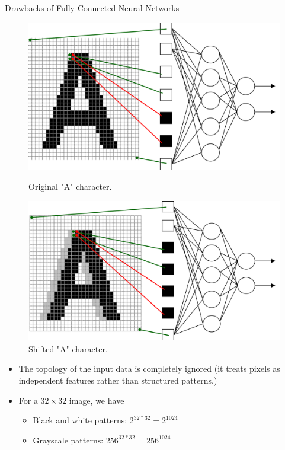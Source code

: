 \documentclass[10pt]{beamer}
\theoremstyle{remark}
\theoremstyle{definition}
\begin{document}
\begin{frame}[allowframebreaks]{Drawbacks of Fully-Connected Neural Networks}
\begin{figure}[ht]
\centering
\begin{minipage}[t]{0.45\textwidth}
    \centering
    \includegraphics[width=\textwidth,height=0.7\textheight,keepaspectratio]{./images/nn_3.png}
    \caption{Original "A" character.}
    \label{fig:original_a}
\end{minipage}
\hfill
\begin{minipage}[t]{0.45\textwidth}
    \centering
    \includegraphics[width=\textwidth,height=0.7\textheight,keepaspectratio]{./images/nn_4.png}
    \caption{Shifted "A" character.}
    \label{fig:shifted_a}
\end{minipage}
\end{figure}


\framebreak

\begin{itemize}
    \item The topology of the input data is completely ignored (it treats pixels as independent features rather than structured patterns.)
    \item For a $32 \times 32$ image, we have
    \begin{itemize}
        \item Black and white patterns: $2^{32*32} = 2^{1024}$
        \item Grayscale patterns: $256^{32*32} = 256^{1024}$
    \end{itemize}
\end{itemize}


\end{frame}
\end{document}
